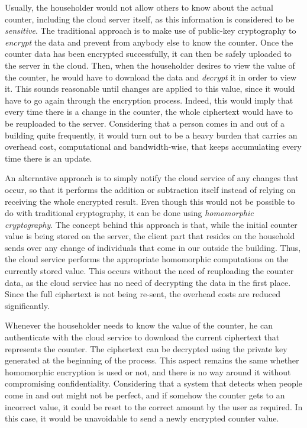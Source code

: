 Usually, the householder would not allow others to know about the actual counter, including the cloud server itself, as this information is considered to be \emph{sensitive}. The traditional approach is to make use of public-key cryptography to \emph{encrypt} the data and prevent from anybody else to know the counter. Once the counter data has been encrypted successfully, it can then be safely uploaded to the server in the cloud. Then, when the householder desires to view the value of the counter, he would have to download the data and \emph{decrypt} it in order to view it. This sounds reasonable until changes are applied to this value, since it would have to go again through the encryption process. Indeed, this would imply that every time there is a change in the counter, the whole ciphertext would have to be reuploaded to the server. Considering that a person comes in and out of a building quite frequently, it would turn out to be a heavy burden that carries an overhead cost, computational and bandwidth-wise, that keeps accumulating every time there is an update. 

An alternative approach is to simply notify the cloud service of any changes that occur, so that it performs the addition or subtraction itself instead of relying on receiving the whole encrypted result. Even though this would not be possible to do with traditional cryptography, it can be done using \emph{homomorphic cryptography}. The concept behind this approach is that, while the initial counter value is being stored on the server, the client part that resides on the household sends over any change of individuals that come in our outside the building. Thus, the cloud service performs the appropriate homomorphic computations on the currently stored value. This occurs without the need of reuploading the counter data, as the cloud service has no need of decrypting the data in the first place. Since the full ciphertext is not being re-sent, the overhead costs are reduced significantly.

Whenever the householder needs to know the value of the counter, he can authenticate with the cloud service to download the current ciphertext that represents the counter. The ciphertext can be decrypted using the private key generated at the beginning of the process. This aspect remains the same whether homomorphic encryption is used or not, and there is no way around it without compromising confidentiality. Considering that a system that detects when people come in and out might not be perfect, and if somehow the counter gets to an incorrect value, it could be reset to the correct amount by the user as required. In this case, it would be unavoidable to send a newly encrypted counter value.

